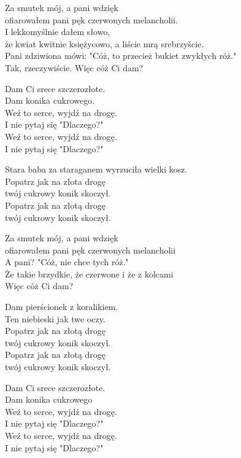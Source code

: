 \begin{text}
    Za smutek mój, a pani wdzięk\\
    ofiarowałem pani pęk czerwonych melancholii.\\
    I lekkomyślnie dałem słowo,\\
    że kwiat kwitnie księżycowo, a liście mrą srebrzyście.\\
    Pani zdziwiona mówi: "Cóż, to przecież bukiet zwykłych róż."\\
    Tak, rzeczywiście. Więc cóż Ci dam?

    Dam Ci srece szczerozłote.\\
    Dam konika cukrowego.\\
    Weź to serce, wyjdź na drogę.\\
    I nie pytaj się "Dlaczego?"\\
    Weź to serce, wyjdź na drogę.\\
    I nie pytaj się "Dlaczego?"

    Stara baba za staraganem wyrzuciła wielki kosz.\\
    Popatrz jak na złota drogę\\
    twój cukrowy konik skoczył.\\
    Popatrz jak na złotą drogę\\
    twój cukrowy konik skoczył.

    Za smutek mój, a pani wdzięk\\
    ofiarowałem pani pęk czerwonych melancholii\\
    A pani? "Cóż, nie chce tych róż."\\
    Że takie brzydkie, że czerwone i że z kolcami\\
    Więc cóż Ci dam?

    Dam pierścionek z koralikiem.\\
    Ten niebieski jak twe oczy.\\
    Popatrz jak na złotą drogę\\
    twój cukrowy konik skoczył.\\
    Popatrz jak na złotą drogę\\
    twój cukrowy konik skoczył.

    Dam Ci srece szczerozłote.\\
    Dam konika cukrowego\\
    Weź to serce, wyjdź na drogę.\\
    I nie pytaj się "Dlaczego?"\\
    Weź to serce, wyjdź na drogę.\\
    I nie pytaj się "Dlaczego?"
\end{text}
\begin{chord}

\end{chord}